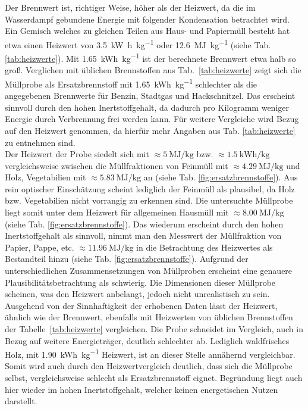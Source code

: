 Der Brennwert ist, richtiger Weise, höher als der Heizwert, da die im Wasserdampf gebundene Energie mit folgender Kondensation betrachtet wird. Ein Gemisch  welches zu gleichen Teilen aus Haus- und Papiermüll besteht hat etwa einen Heizwert von \SI{3,5}{\kilo\watt\hour\per\kilogram} oder \SI{12,6}{\mega\joule\per\kilogram} (siehe Tab. \ref{tab:heizwerte}). Mit \SI{1,65}{\kWh\per\kg} ist der berechnete Brennwert etwa halb so groß. Verglichen mit üblichen Brennstoffen aus \mbox{Tab. \ref{tab:heizwerte}} zeigt sich die Müllprobe als Ersatzbrennstoff mit \SI{1,65}{\kWh\per\kg} schlechter als die angegebenen Brennwerte für Benzin, Stadtgas und Hackschnitzel. Das erscheint sinnvoll durch den hohen Inertstoffgehalt, da dadurch pro Kilogramm weniger Energie durch Verbrennung frei werden kann. Für weitere Vergleiche wird Bezug auf den Heizwert genommen, da hierfür mehr Angaben aus Tab. \ref{tab:heizwerte} zu entnehmen sind.\\ 
Der Heizwert der Probe siedelt sich mit $\approx \SI{5}{\mega \joule \per \kg}$ bzw. $\approx \SI{1,5}{\kWh\per\kg}$ vergleichsweise zwischen die Müllfraktionen von Feinmüll mit $\approx \SI{4,29}{\mega \joule \per \kg}$ und Holz, Vegetabilien mit $\approx \SI{5,83}{\mega \joule \per \kg}$ an (siehe Tab. \ref{fig:ersatzbrennstoffe}). Aus rein optischer Einschätzung scheint lediglich der Feinmüll als plausibel, da Holz bzw. Vegetabilien nicht vorrangig zu erkennen sind. Die untersuchte Müllprobe liegt somit unter dem Heizwert für allgemeinen Hausmüll mit $\approx \SI{8,00}{\mega \joule \per \kg}$ (siehe Tab. \ref{fig:ersatzbrennstoffe}). Das wiederum erscheint durch den hohen Inertstoffgehalt als sinnvoll, nimmt man den Messwert der Müllfraktion von Papier, Pappe, etc. $\approx \SI{11,96}{\mega \joule \per \kg}$ in die Betrachtung des Heizwertes als Bestandteil hinzu (siehe Tab. \ref{fig:ersatzbrennstoffe}). Aufgrund der unterschiedlichen Zusammensetzungen von Müllproben erscheint eine genauere Plausibilitätsbetrachtung als schwierig. \linebreak
Die Dimensionen dieser Müllprobe scheinen, was den Heizwert anbelangt, jedoch nicht unrealistisch zu sein.\\
Ausgehend von der Sinnhaftigkeit der erhobenen Daten lässt der Heizwert, ähnlich wie der Brennwert, ebenfalls mit Heizwerten von üblichen Brennstoffen der \mbox{Tabelle \ref{tab:heizwerte}} vergleichen. Die Probe schneidet im Vergleich, auch in Bezug auf weitere Energieträger, deutlich schlechter ab. Lediglich waldfrisches Holz, mit \SI{1,90}{\kWh\per\kg} Heizwert, ist an dieser Stelle annähernd vergleichbar. Somit wird auch durch den Heizwertvergleich deutlich, dass sich die Müllprobe selbst, vergleichsweise schlecht als Ersatzbrennstoff eignet. Begründung liegt auch hier wieder im hohen Inertstoffgehalt, welcher keinen energetischen Nutzen darstellt.
